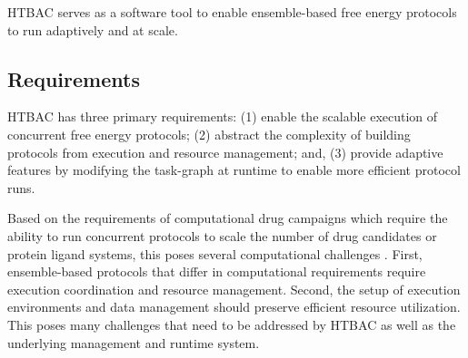 HTBAC serves as a software tool to enable ensemble-based free energy
protocols to run adaptively and at scale.





\subsection{Requirements}

HTBAC has three primary requirements: (1) enable the scalable execution of
concurrent free energy protocols; (2) abstract the complexity of building
protocols from execution and resource management; and, (3) provide adaptive
features by modifying the task-graph at runtime to enable more efficient
protocol runs.



Based on the requirements of computational drug campaigns which require the
ability to run concurrent protocols to scale the number of drug candidates or
protein ligand systems, this poses several computational challenges
. First,
ensemble-based protocols that differ in computational requirements require
execution coordination and resource management. Second, the setup of
execution environments and data management should preserve efficient resource
utilization. This poses many challenges that need to be addressed by HTBAC as
well as the underlying management and runtime system.

